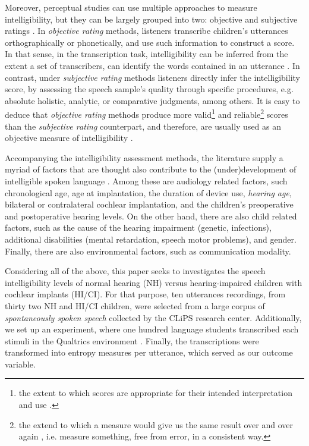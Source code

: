 Moreover, perceptual studies can use multiple approaches to measure intelligibility, but they can be largely grouped into two: objective and subjective ratings \citep{Hustad_et_al_2020}. In \textit{objective rating} methods, listeners transcribe children's utterances orthographically or phonetically, and use such information to construct a score. In that sense, in the transcription task, intelligibility can be inferred from the extent a set of transcribers, can identify the words contained in an utterance \cite{Boonen_et_al_2021}. In contrast, under \textit{subjective rating} methods listeners directly infer the intelligibility score, by assessing the speech sample's quality through specific procedures, e.g. absolute holistic, analytic, or comparative judgments, among others. It is easy to deduce that \textit{objective rating} methods produce more valid\footnote{the extent to which scores are appropriate for their intended interpretation and use \citep{Lesterhuis_2018, Trochim_2022}.} and reliable\footnote{the extend to which a measure would give us the same result over and over again \citep{Trochim_2022}, i.e. measure something, free from error, in a consistent way.} scores than the \textit{subjective rating} counterpart, and therefore, are usually used as an objective measure of intelligibility \citep{Boonen_et_al_2021, Faes_et_al_2021}.

Accompanying the intelligibility assessment methods, the literature supply a myriad of factors that are thought also contribute to the (under)development of intelligible spoken language \cite{Niparko_et_al_2010, Boons_et_al_2012, Gillis_2018, Fagan_et_al_2020}. Among these are audiology related factors, such chronological age, age at implantation, the duration of device use, \textit{hearing age}, bilateral or contralateral cochlear implantation, and the children's preoperative and postoperative hearing levels. On the other hand, there are also child related factors, such as the cause of the hearing impairment (genetic, infections), additional disabilities (mental retardation, speech motor problems), and gender. Finally, there are also environmental factors, such as communication modality. 

Considering all of the above, this paper seeks to investigates the speech intelligibility levels of normal hearing (NH) versus hearing-impaired children with cochlear implants (HI/CI). For that purpose, ten utterances recordings, from thirty two NH and HI/CI children, were selected from a large corpus of \textit{spontaneously spoken speech} collected by the CLiPS research center. Additionally, we set up an experiment, where one hundred language students transcribed each stimuli in the Qualtrics environment \cite{Qualtrics_2005}. Finally, the transcriptions were transformed into entropy measures per utterance, which served as our outcome variable.

